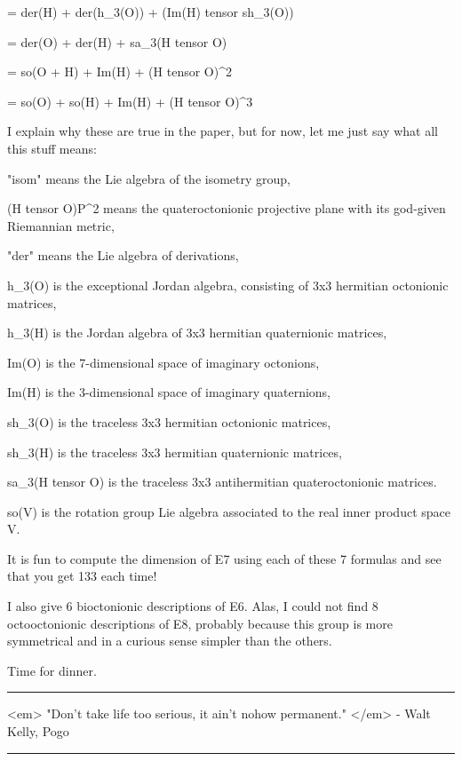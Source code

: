     = der(H) + der(h_{3}(O)) +  (Im(H) tensor sh_{3}(O)) 

    = der(O) + der(H) + sa_{3}(H tensor O) 

    = so(O + H) + Im(H) + (H tensor O)^{2} 

    = so(O) + so(H) + Im(H) + (H tensor O)^{3}  
$$
    
I explain why these are true in the paper, but for now, let me
just say what all this stuff means:

"isom" means the Lie algebra of the isometry group, 

(H tensor O)P^{2} means the quateroctonionic projective plane
with its god-given Riemannian metric, 

"der" means the Lie algebra of derivations,

h_{3}(O) is the exceptional Jordan algebra, consisting of 3x3 
hermitian octonionic matrices,

h_{3}(H) is the Jordan algebra of 3x3 hermitian quaternionic
matrices,

Im(O) is the 7-dimensional space of imaginary octonions,

Im(H) is the 3-dimensional space of imaginary quaternions,

sh_{3}(O) is the traceless 3x3 hermitian octonionic matrices,

sh_{3}(H) is the traceless 3x3 hermitian quaternionic matrices,

sa_{3}(H tensor O) is the traceless 3x3 antihermitian quateroctonionic
matrices.

so(V) is the rotation group Lie algebra associated to the 
real inner product space V.

It is fun to compute the dimension of E7 using each of these
7 formulas and see that you get 133 each time!  

I also give 6 bioctonionic descriptions of E6.  Alas, I could
not find 8 octooctonionic descriptions of E8, probably because
this group is more symmetrical and in a curious sense simpler 
than the others.

Time for dinner.



 \par\noindent\rule{\textwidth}{0.4pt}
<em> "Don't take life too serious, it ain't nohow permanent."
</em> - Walt Kelly, Pogo

\par\noindent\rule{\textwidth}{0.4pt}

